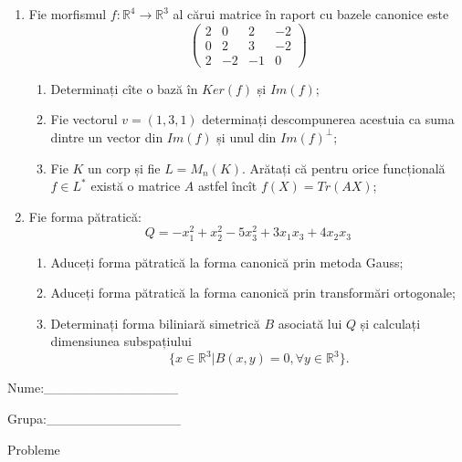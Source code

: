 \documentclass{article}
\begin{document}
\begin{enumerate}
 \item Fie morfismul $f:\mathbb{R}^4 \to \mathbb{R}^3$ al cărui matrice în raport cu bazele canonice este
$$\begin{pmatrix}
2&0&2&-2\\
0&2&3&-2\\
2&-2&-1&0
\end{pmatrix}$$

\begin{enumerate}
\item Determinați cîte o bază în $Ker(f)$ și $Im(f)$;
\item Fie vectorul $v=(1,3,1)$ determinați descompunerea acestuia ca suma dintre un vector din $Im(f)$ și unul din $Im(f)^\perp$;
\item Fie $K$ un corp și fie $L=M_n(K)$. Arătați că pentru orice funcțională $f \in L^*$ există o matrice $A$ astfel încît $f(X)=Tr(AX)$;
\end{enumerate}
\item Fie forma pătratică:
$$Q= -x_1^2+x_2^2-5x_3^2+3x_1x_3+4x_2x_3$$

\begin{enumerate}
\item Aduceți forma pătratică la forma canonică prin metoda Gauss;
\item Aduceți forma pătratică la forma canonică prin transformări ortogonale;
\item Determinați forma biliniară simetrică $B$ asociată lui $Q$ și calculați dimensiunea subspațiului
$$\{x \in \mathbb{R}^3 | B(x,y)=0,\forall y \in \mathbb{R}^3\}.$$

\end{enumerate}
\end{enumerate}
\newpage
\begin{flushright}
Nume:\_\_\_\_\_\_\_\_\_\_\_\_\_\_
 
 
Grupa:\_\_\_\_\_\_\_\_\_\_\_\_\_\_
\end{flushright}
\begin{center}
\vspace{2cm}
{\Large Probleme}
\vspace{2cm}
\end{center}
\end{document}
